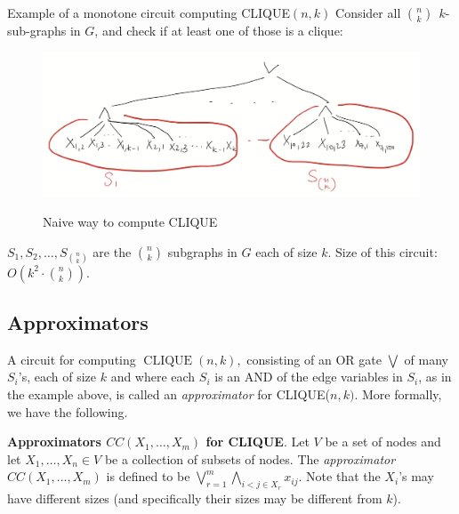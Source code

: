 \begin{trailer}{Example of a monotone circuit computing CLIQUE$(n, k)$}
Consider  all $\binom{n}{k} ~~ k$-sub-graphs in $G$, and check if at least one of those is a clique:

\begin{figure}
    \centering
    \includegraphics[width=0.75\linewidth]{images/k-clique-simple-circuit.png}
    \label{fig:clique-naive}
    \caption{Naive way to compute CLIQUE}
\end{figure}

$S_1, S_2, \ldots, S_{\binom{n}{k}}$ are the $\binom{n}{k}$ subgraphs in $G$ each of size $k$.
Size of this circuit: $O\left(k^2 \cdot\binom{n}{k}\right)$.
\end{trailer}

\subsection{Approximators}

A  circuit for computing $\operatorname{CLIQUE}  (n, k),$ consisting of an OR gate $\bigvee$ of many  $S_i$'s, each of size $k$ and where each $S_i$ is an AND of the edge variables in $S_i$, as in the example above, is called an \textit{approximator} for CLIQUE($n, k)$. More formally, we have the following. 


\begin{tcolorbox}[colframe=white, colback=red!5, boxrule=0mm, sharp corners]
\textbf{Approximators $CC\left(X_1, \ldots, X_m\right)$ for CLIQUE}.
Let $V$ be a set of nodes and let $X_1,\dots,X_n\in V$ be a collection of subsets of nodes. The \emph{approximator} $CC\left(X_1, \ldots, X_m\right)$ is defined to be 
$\bigvee_{r=1}^m\bigwedge_{i<j \in X_r} x_{ij}$.
Note that the $X_i$'s may have different sizes (and specifically their sizes may be different from $k$).
\end{tcolorbox}
 
